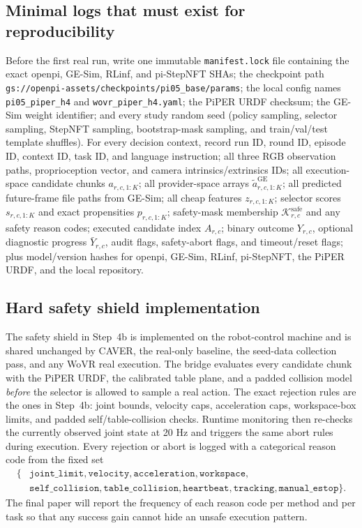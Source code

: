 \documentclass[10pt]{article}
\theoremstyle{plain}
\theoremstyle{definition}
\theoremstyle{remark}
\begin{document}
\subsection{Minimal logs that must exist for reproducibility}
Before the first real run, write one immutable \texttt{manifest.lock} file containing the exact openpi, GE-Sim, RLinf, and pi-StepNFT SHAs; the checkpoint path \texttt{gs://openpi-assets/checkpoints/pi05\_base/params}; the local config names \texttt{pi05\_piper\_h4} and \texttt{wovr\_piper\_h4.yaml}; the PiPER URDF checksum; the GE-Sim weight identifier; and every study random seed (policy sampling, selector sampling, StepNFT sampling, bootstrap-mask sampling, and train/val/test template shuffles). For every decision context, record run ID, round ID, episode ID, context ID, task ID, and language instruction; all three RGB observation paths, proprioception vector, and camera intrinsics/extrinsics IDs; all execution-space candidate chunks $a_{r,c,1:K}$; all provider-space arrays $\tilde a^{\mathrm{GE}}_{r,c,1:K}$; all predicted future-frame file paths from GE-Sim; all cheap features $z_{r,c,1:K}$; selector scores $s_{r,c,1:K}$ and exact propensities $p_{r,c,1:K}$; safety-mask membership $\mathcal K^{\mathrm{safe}}_{r,c}$ and any safety reason codes; executed candidate index $A_{r,c}$; binary outcome $Y_{r,c}$, optional diagnostic progress $\bar Y_{r,c}$, audit flags, safety-abort flags, and timeout/reset flags; plus model/version hashes for openpi, GE-Sim, RLinf, pi-StepNFT, the PiPER URDF, and the local repository.


\subsection{Hard safety shield implementation}
The safety shield in Step~4b is implemented on the robot-control machine and is shared unchanged by CAVER, the real-only baseline, the seed-data collection pass, and any WoVR real execution. The bridge evaluates every candidate chunk with the PiPER URDF, the calibrated table plane, and a padded collision model \emph{before} the selector is allowed to sample a real action. The exact rejection rules are the ones in Step~4b: joint bounds, velocity caps, acceleration caps, workspace-box limits, and padded self/table-collision checks. Runtime monitoring then re-checks the currently observed joint state at 20 Hz and triggers the same abort rules during execution. Every rejection or abort is logged with a categorical reason code from the fixed set
\[
\begin{aligned}
\{&\texttt{joint\_limit},\texttt{velocity},\texttt{acceleration},\texttt{workspace},\\
  &\texttt{self\_collision},\texttt{table\_collision},\texttt{heartbeat},
    \texttt{tracking},\texttt{manual\_estop}\}.
\end{aligned}
\]
The final paper will report the frequency of each reason code per method and per task so that any success gain cannot hide an unsafe execution pattern.
\end{document}
